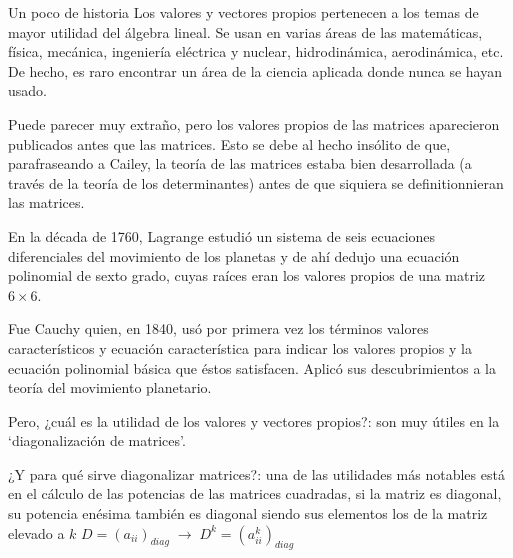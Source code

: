 \vspace{1cm}

\begin{myexampleblock}{Un poco de historia}
Los valores y vectores propios pertenecen a los temas de mayor utilidad del álgebra lineal. Se usan en varias áreas de las matemáticas, física, mecánica, ingeniería eléctrica y nuclear, hidrodinámica, aerodinámica, etc. De hecho, es raro encontrar un área de la ciencia aplicada donde nunca se hayan usado. 

\vspace {2mm} Puede parecer muy extraño, pero los valores propios de las matrices aparecieron publicados antes que las matrices. Esto se debe al hecho insólito de que, parafraseando a Cailey, la teoría de las matrices estaba bien desarrollada (a través de la teoría de los determinantes) antes de que siquiera se definitionnieran las matrices.  

\vspace {2mm}  En la década de 1760, Lagrange estudió un sistema de seis ecuaciones diferenciales del movimiento de los planetas y de ahí dedujo una ecuación polinomial de sexto grado, cuyas raíces eran los valores propios de una matriz $6 \times 6$. 

\vspace {2mm} Fue Cauchy quien, en 1840, usó por primera vez los términos valores característicos y ecuación característica para indicar los valores propios y la ecuación polinomial básica que éstos satisfacen. Aplicó sus descubrimientos a la teoría del movimiento planetario.	

\vspace {2mm} Pero, ¿cuál es la utilidad de los valores y vectores propios?: son muy útiles en la `diagonalización de matrices'.

\vspace {2mm} ¿Y para qué sirve diagonalizar matrices?: una de las utilidades más notables está en el cálculo de las potencias de las matrices cuadradas, si la matriz es diagonal, su potencia enésima también es diagonal siendo sus elementos los de la matriz elevado a $k$ \textcolor{gris}{$D=(a_{ii})_{diag} 	\; \to \; D^k=(a^k_{ii})_{diag}$}
\end{myexampleblock}




